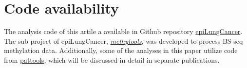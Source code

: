 \documentclass[10pt]{article}
\begin{document}
\section{Code availability}\label{sec:code}

The analysis code of this artile a available in Github repository
\href{https://github.com/hcyvan/epiLungCancer}{epiLungCancer}. The sub project of epiLungCancer,
\href{https://github.com/hcyvan/epiLungCancer/tree/main/methytools}{\textit{methytools}},  was developed
to process BS-seq methylation data. Additionally, some of the analyses in this paper utilize code
from \href{https://github.com/hcyvan/pattools}{pattools}, which will be discussed in detail in
separate publications.





\end{document}
